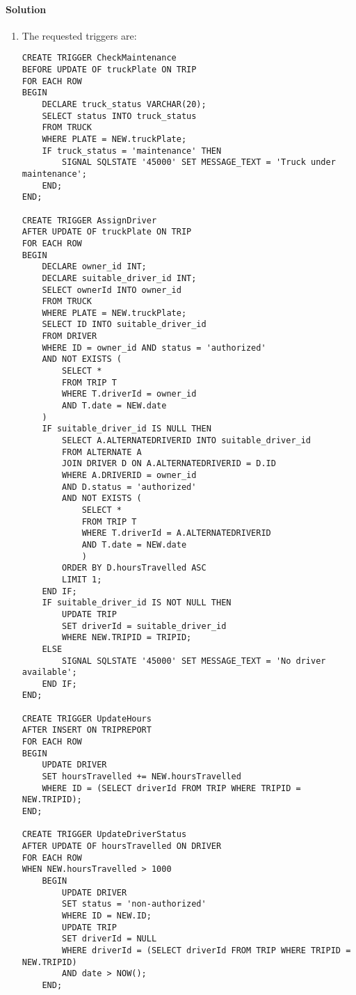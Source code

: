 \paragraph*{Solution}
\begin{enumerate}
    \item The requested triggers are: 
        \begin{lstlisting}[style=SQL]
CREATE TRIGGER CheckMaintenance
BEFORE UPDATE OF truckPlate ON TRIP
FOR EACH ROW
BEGIN
    DECLARE truck_status VARCHAR(20);
    SELECT status INTO truck_status
    FROM TRUCK
    WHERE PLATE = NEW.truckPlate;
    IF truck_status = 'maintenance' THEN
        SIGNAL SQLSTATE '45000' SET MESSAGE_TEXT = 'Truck under maintenance';
    END;
END;

CREATE TRIGGER AssignDriver
AFTER UPDATE OF truckPlate ON TRIP
FOR EACH ROW
BEGIN
    DECLARE owner_id INT;
    DECLARE suitable_driver_id INT;
    SELECT ownerId INTO owner_id
    FROM TRUCK
    WHERE PLATE = NEW.truckPlate;
    SELECT ID INTO suitable_driver_id
    FROM DRIVER
    WHERE ID = owner_id AND status = 'authorized'
    AND NOT EXISTS (
        SELECT *
        FROM TRIP T
        WHERE T.driverId = owner_id
        AND T.date = NEW.date
    )
    IF suitable_driver_id IS NULL THEN
        SELECT A.ALTERNATEDRIVERID INTO suitable_driver_id
        FROM ALTERNATE A
        JOIN DRIVER D ON A.ALTERNATEDRIVERID = D.ID
        WHERE A.DRIVERID = owner_id
        AND D.status = 'authorized'
        AND NOT EXISTS (
            SELECT *
            FROM TRIP T
            WHERE T.driverId = A.ALTERNATEDRIVERID
            AND T.date = NEW.date
            )
        ORDER BY D.hoursTravelled ASC
        LIMIT 1;
    END IF;
    IF suitable_driver_id IS NOT NULL THEN
        UPDATE TRIP
        SET driverId = suitable_driver_id
        WHERE NEW.TRIPID = TRIPID;
    ELSE
        SIGNAL SQLSTATE '45000' SET MESSAGE_TEXT = 'No driver available';
    END IF;
END;

CREATE TRIGGER UpdateHours
AFTER INSERT ON TRIPREPORT
FOR EACH ROW
BEGIN
    UPDATE DRIVER
    SET hoursTravelled += NEW.hoursTravelled
    WHERE ID = (SELECT driverId FROM TRIP WHERE TRIPID = NEW.TRIPID);
END;

CREATE TRIGGER UpdateDriverStatus
AFTER UPDATE OF hoursTravelled ON DRIVER
FOR EACH ROW
WHEN NEW.hoursTravelled > 1000
    BEGIN
        UPDATE DRIVER
        SET status = 'non-authorized'
        WHERE ID = NEW.ID;
        UPDATE TRIP
        SET driverId = NULL
        WHERE driverId = (SELECT driverId FROM TRIP WHERE TRIPID = NEW.TRIPID)
        AND date > NOW();
    END;
        \end{lstlisting}
\end{enumerate}